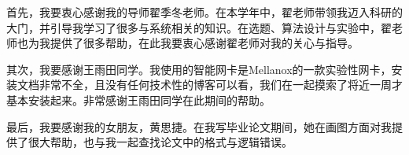 \begin{acknowledgement}
  首先，我要衷心感谢我的导师翟季冬老师。在本学年中，翟老师带领我迈入科研的大门，并引导我学习了很多与系统相关的知识。在选题、算法设计与实验中，翟老师也为我提供了很多帮助，在此我要衷心感谢翟老师对我的关心与指导。

  其次，我要感谢王雨田同学。我使用的智能网卡是Mellanox的一款实验性网卡，安装文档非常不全，且没有任何技术性的博客可以看，我们在一起摸索了将近一周才基本安装起来。非常感谢王雨田同学在此期间的帮助。

  最后，我要感谢我的女朋友，黄思捷。在我写毕业论文期间，她在画图方面对我提供了很大帮助，也与我一起查找论文中的格式与逻辑错误。
\end{acknowledgement}
